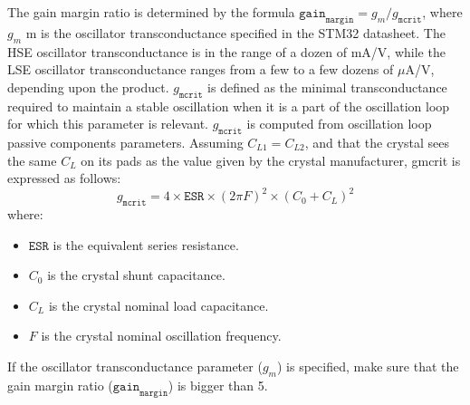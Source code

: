 The gain margin ratio is determined by the formula $\texttt{gain}_{\texttt{margin}} = g_m / g_{\texttt{mcrit}}$, where $g_m$ m is the oscillator transconductance specified in the STM32 datasheet. The HSE oscillator transconductance is in the range of a dozen of mA/V, while the LSE oscillator transconductance ranges from a few to a few dozens of $\mu$A/V, depending upon the product.
$g_{\texttt{mcrit}}$ is defined as the minimal transconductance required to maintain a stable oscillation when it is a part of the oscillation loop for which this parameter is relevant. $g_{\texttt{mcrit}}$ is computed from oscillation loop passive components parameters. 
\nl
Assuming $C_{L1} = C_{L2}$, and that the crystal sees the same $C_L$ on its pads as the value given by the crystal manufacturer, gmcrit is expressed as follows:
\begin{equation}
    g_{\texttt{mcrit}} = 4\times \texttt{ESR} \times (2\pi F)^2 \times (C_0 + C_L)^2
\end{equation} 
where:
\begin{itemize}
    \item $\texttt{ESR}$ is the equivalent series resistance.
    \item $C_0$ is the crystal shunt capacitance.
    \item $C_L$ is the crystal nominal load capacitance.
    \item $F$ is the crystal nominal oscillation frequency.
\end{itemize}
If the oscillator transconductance parameter ($g_m$) is specified, make sure that the gain margin ratio ($\texttt{gain}_{\texttt{margin}}$) is bigger than 5.